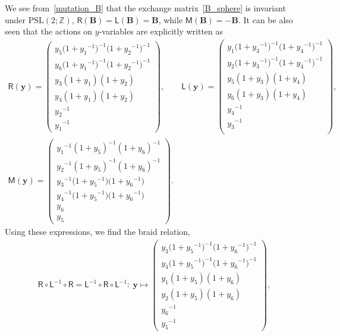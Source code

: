 \documentclass[pdftex]{sigma}
\numberwithin{equation}{section}
\begin{document}
We see from~\eqref{mutation_B} that the exchange matrix~\eqref{B_sphere} is invariant under $\mathrm{PSL}(2;\mathbb{Z})$, $\mathsf{R}(\mathbf{B})=\mathsf{L}(\mathbf{B})=\mathbf{B}$, while $\mathsf{M}(\mathbf{B})=-\mathbf{B}$. It can be also seen that the actions on $y$-variables are explicitly written as
 \begin{gather*}%
 \mathsf{R}(\boldsymbol{y}) =
 \begin{pmatrix}
 y_5 \big( 1+ {y_1}^{-1} \big)^{-1}
 \big( 1+{y_2}^{-1} \big)^{-1} \\
 y_6 \big( 1+ {y_1}^{-1} \big)^{-1}
 \big( 1+{y_2}^{-1} \big)^{-1} \\
 y_3 ( 1+y_1 ) ( 1+y_2 ) \\
 y_4 ( 1+y_1 ) ( 1+y_2 ) \\
 {y_2}^{-1} \\
 {y_1}^{-1}
 \end{pmatrix} , \qquad
 \mathsf{L}(\boldsymbol{y}) =
 \begin{pmatrix}
 y_1 \big( 1+ {y_3}^{-1} \big)^{-1}
 \big( 1+{y_4}^{-1} \big)^{-1} \\
 y_2 \big( 1+ {y_3}^{-1} \big)^{-1}
 \big( 1+{y_4}^{-1} \big)^{-1} \\
 y_5 ( 1+y_3 ) ( 1+y_4 ) \\
 y_6 ( 1+y_3 ) ( 1+y_4 ) \\
 {y_4}^{-1} \\
 {y_3}^{-1} \\
 \end{pmatrix} , \\
 \mathsf{M}(\boldsymbol{y}) =
 \begin{pmatrix}
 {y_1}^{-1} ( 1+y_5 )^{-1} ( 1+y_6 )^{-1} \\
 {y_2}^{-1} ( 1+y_5 )^{-1} ( 1+y_6 )^{-1} \\
 {y_3}^{-1} \big( 1+{y_5}^{-1} \big) \big( 1+{y_6}^{-1} \big) \\
 {y_4}^{-1} \big( 1+{y_5}^{-1} \big) \big(1+{y_6}^{-1} \big) \\
 y_6 \\
 y_5
 \end{pmatrix} .
 \end{gather*}
 Using these expressions, we find the braid relation,
 \begin{gather*}
 \mathsf{R} \circ \mathsf{L}^{-1} \circ \mathsf{R} = \mathsf{L}^{-1} \circ \mathsf{R} \circ \mathsf{L}^{-1}\colon \
 \boldsymbol{y}
 \mapsto
 \begin{pmatrix}
 y_3 \big( 1+{y_5}^{-1} \big)^{-1} \big( 1+{y_6}^{-1} \big)^{-1} \\
 y_4 \big( 1+{y_5}^{-1} \big)^{-1} \big( 1+{y_6}^{-1} \big)^{-1} \\
 y_1 ( 1+y_5 ) ( 1+y_6 ) \\
 y_2 ( 1+y_5 ) ( 1+y_6 ) \\
 {y_6}^{-1} \\
 {y_5}^{-1}
 \end{pmatrix} ,
 \end{gather*}
\end{document}
